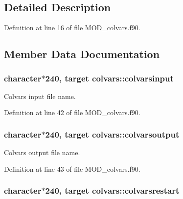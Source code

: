 \subsection{Detailed Description}


Definition at line 16 of file M\-O\-D\-\_\-colvars.\-f90.



\subsection{Member Data Documentation}
\hypertarget{classcolvars_ac0a4109a01ca0d085e554c69b680bae6}{
\subsubsection[{colvarsinput}]{\setlength{\rightskip}{0pt plus 5cm}character$\ast$240, target colvars\-::colvarsinput}}\label{classcolvars_ac0a4109a01ca0d085e554c69b680bae6}


Colvars input file name. 



Definition at line 42 of file M\-O\-D\-\_\-colvars.\-f90.

\hypertarget{classcolvars_ace5f8d0a42a5abb1c7323ea9bdf02d1c}{
\subsubsection[{colvarsoutput}]{\setlength{\rightskip}{0pt plus 5cm}character$\ast$240, target colvars\-::colvarsoutput}}\label{classcolvars_ace5f8d0a42a5abb1c7323ea9bdf02d1c}


Colvars output file name. 



Definition at line 43 of file M\-O\-D\-\_\-colvars.\-f90.

\hypertarget{classcolvars_a5e868c0de4c9369d799f9dda1dbcb738}{
\subsubsection[{colvarsrestart}]{\setlength{\rightskip}{0pt plus 5cm}character$\ast$240, target colvars\-::colvarsrestart}}\label{classcolvars_a5e868c0de4c9369d799f9dda1dbcb738}


